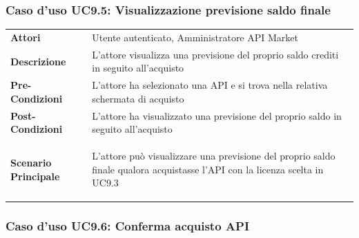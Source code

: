\subsubsection{Caso d'uso UC9.5: Visualizzazione previsione saldo finale}
\label{UC9_5}

\begin{minipage}{\linewidth}
	\begin{tabular}{ l | p{11cm}}
		\hline
		\rowcolor{Gray}
		\multicolumn{2}{c}{UC9.5 - Visualizzazione previsione saldo finale} \\
		\hline
		\textbf{Attori} & Utente autenticato, Amministratore API Market \\
		\textbf{Descrizione} & L'attore visualizza una previsione del proprio saldo crediti in seguito all'acquisto\\
		\textbf{Pre-Condizioni} & L'attore ha selezionato una API e si trova nella relativa schermata di acquisto \\
		\textbf{Post-Condizioni} & L'attore ha visualizzato una previsione del proprio saldo in seguito all'acquisto \\
		\textbf{Scenario Principale} & 
		\begin{enumerate*}[label=(\arabic*.),itemjoin={\newline}]
			\item L'attore può visualizzare una previsione del proprio saldo finale qualora acquistasse l'API con la licenza scelta in UC9.3
		\end{enumerate*}\\
	\end{tabular}
\end{minipage}

\subsubsection{Caso d'uso UC9.6: Conferma acquisto API}
\label{UC9_6}

